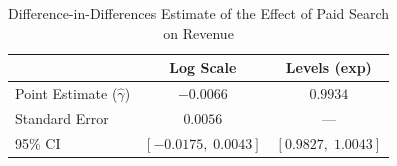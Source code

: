 \begin{table}[h]
\centering
\caption{Difference-in-Differences Estimate of the Effect of Paid Search on Revenue}
\begin{tabular}{lcc}
\hline
 & Log Scale & Levels (exp) \\
\hline
Point Estimate ($\hat{\gamma}$) & $-0.0066$ & $0.9934$ \\
Standard Error & $0.0056$ & --- \\
95\% CI & $[-0.0175, \; 0.0043]$ & $[0.9827, \; 1.0043]$ \\
\hline
\end{tabular}
\label{tab:did}
\end{table}
